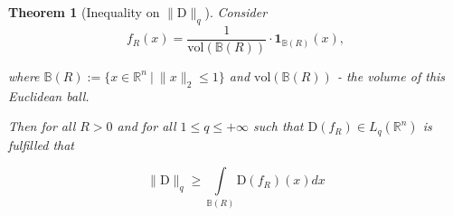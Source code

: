 \documentclass{article}
\newtheorem{theorem}{Theorem}
\begin{document}
    
    \begin{theorem}[Inequality on $\|\text{D}\|_q$] \label{ineq_q}
        Consider 
        \begin{equation}\label{f_R}
            f_R(x) = \dfrac{1}{\text{vol}(\mathbb{B}(R))} \cdot \textbf{1}_{\mathbb{B}(R)}(x),
        \end{equation}

        where $\mathbb{B}(R) := \{x \in \mathbb{R}^n ~|~ \|x\|_2 \leq 1\}$ and $\text{vol}(\mathbb{B}(R))$ - the volume of this Euclidean ball.

        Then for all $R > 0$ and for all $1 \leq q \leq +\infty$ such that $\text{D}(f_R) \in L_q(\mathbb{R}^n)$ is fulfilled that  

        \begin{equation}\label{int_f_R}
            \|\text{D}\|_q \geq \int\limits_{\mathbb{B}(R)} \text{D}(f_R)(x)dx
        \end{equation}
    \end{theorem}
    
\end{document}
